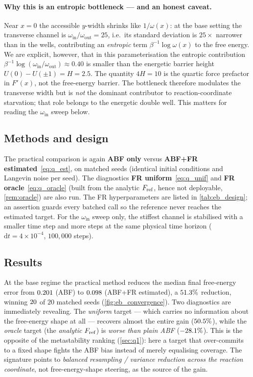 \paragraph{Why this is an entropic bottleneck --- and an honest caveat.}
Near $x=0$ the accessible $y$-width shrinks like $1/\omega(x)$: at the base
setting the transverse channel is $\omega_{\mathrm{in}}/\omega_{\mathrm{out}}=25$,
i.e.\ its standard deviation is $25\times$ narrower than in the wells,
contributing an \emph{entropic}
term $\beta^{-1}\log\omega(x)$ to the free energy. We are explicit, however, that
in this parameterisation the entropic contribution
$\beta^{-1}\log(\omega_{\mathrm{in}}/\omega_{\mathrm{out}})\approx0.40$ is smaller
than the energetic barrier height $U(0)-U(\pm1)=H=2.5$. The quantity $4H=10$ is the
quartic force prefactor in $F'(x)$, not the free-energy barrier. The bottleneck
therefore modulates the transverse width but is \emph{not} the dominant
contributor to reaction-coordinate starvation; that role belongs to the energetic
double well. This matters for reading the $\omega_{\mathrm{in}}$ sweep below.

\subsection{Methods and design}
The practical comparison is again \textbf{ABF only} versus \textbf{ABF+FR
estimated}~\eqref{eq:q_est}, on matched seeds (identical initial conditions and
Langevin noise per seed). The diagnostics \textbf{FR uniform}~\eqref{eq:q_unif}
and \textbf{FR oracle}~\eqref{eq:q_oracle} (built from the analytic $F_{\mathrm{ref}}$, hence
not deployable, \cref{rem:oracle}) are also run. The FR hyperparameters are listed
in \cref{tab:eb_design}; an assertion guards every batched call so the reference
never reaches the estimated target. For the $\omega_{\mathrm{in}}$ sweep only, the
stiffest channel is stabilised with a smaller time step and more steps at the same
physical time horizon ($\mathrm{d}t=4\times10^{-4}$, $100{,}000$ steps).



\subsection{Results}
At the base regime the practical method reduces the median final free-energy
error from $0.201$ (ABF) to $0.098$ (ABF+FR estimated), a
$51.3\%$ reduction, winning $20$ of $20$ matched seeds
(\cref{fig:eb_convergence}). Two diagnostics are immediately revealing. The
\emph{uniform} target --- which carries no information about the free-energy
shape at all --- recovers almost the entire gain ($50.5\%$), while the
\emph{oracle} target (the \emph{analytic} $F_{\mathrm{ref}}$) is \emph{worse than plain ABF}
($-28.1\%$). This is the opposite of the metastability ranking
(\cref{sec:q1}): here a target that over-commits to a fixed shape fights the ABF
bias instead of merely equalising coverage. The signature points to
\emph{balanced resampling / variance reduction across the reaction coordinate}, not
free-energy-shape steering, as the source of the gain.


